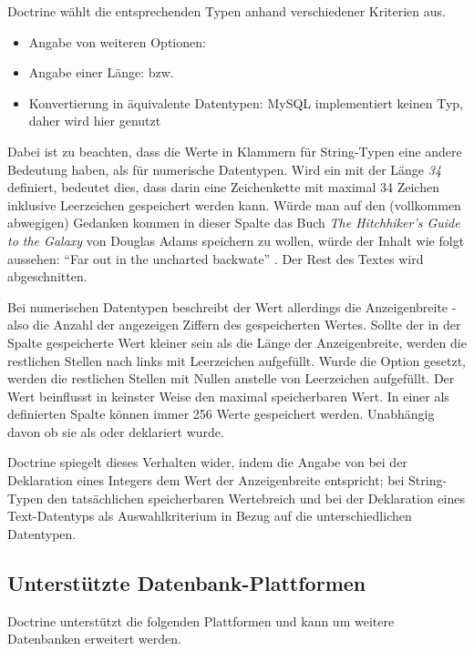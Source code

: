 Doctrine wählt die entsprechenden Typen anhand verschiedener Kriterien aus.

\begin{itemize}
	\item Angabe von weiteren Optionen: 
	\item Angabe einer Länge:  bzw. 
	\item Konvertierung in äquivalente Datentypen: MySQL implementiert keinen  Typ, daher wird hier  genutzt
\end{itemize}

Dabei ist zu beachten, dass die Werte in Klammern für String-Typen eine andere Bedeutung haben, als für numerische Datentypen. Wird ein  mit der Länge \textit{34} definiert, bedeutet dies, dass darin eine Zeichenkette mit maximal 34 Zeichen inklusive Leerzeichen gespeichert werden kann. Würde man auf den (vollkommen abwegigen) Gedanken kommen in dieser Spalte das Buch \textit{The Hitchhiker's Guide to the Galaxy} von Douglas Adams speichern zu wollen, würde der Inhalt wie folgt aussehen: ``Far out in the uncharted backwate'' \cite[S. 3]{book:adamsHitchhikers1995}. Der Rest des Textes wird abgeschnitten.

Bei numerischen Datentypen beschreibt der Wert allerdings die Anzeigenbreite - also die Anzahl der angezeigen Ziffern des gespeicherten Wertes. Sollte der in der Spalte gespeicherte Wert kleiner sein als die Länge der Anzeigenbreite, werden die restlichen Stellen nach links mit Leerzeichen aufgefüllt. Wurde die Option  gesetzt, werden die restlichen Stellen mit Nullen anstelle von Leerzeichen aufgefüllt. Der Wert beinflusst in keinster Weise den maximal speicherbaren Wert. In einer als  definierten Spalte können immer 256 Werte gespeichert werden. Unabhängig davon ob sie als  oder  deklariert wurde.

Doctrine spiegelt dieses Verhalten wider, indem die Angabe von  bei der Deklaration eines Integers dem Wert der Anzeigenbreite entspricht; bei String-Typen den tatsächlichen speicherbaren Wertebreich und bei der Deklaration eines Text-Datentyps als Auswahlkriterium in Bezug auf die unterschiedlichen  Datentypen.

\subsection{Unterstützte Datenbank-Plattformen}
\label{basics:doctrine:subsec:supportedPlatforms}
Doctrine unterstützt die folgenden Plattformen und kann um weitere Datenbanken erweitert werden.

